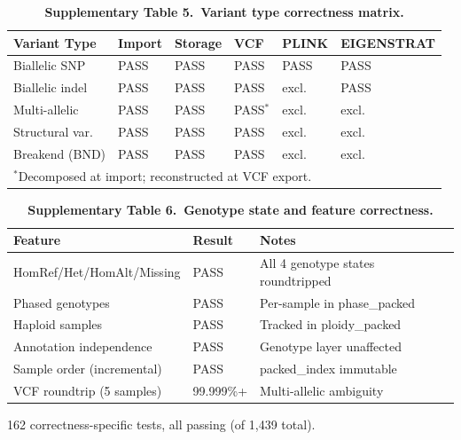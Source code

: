 \documentclass[11pt,a4paper]{article}
\begin{document}
\begin{table}[p]
\centering
\caption*{\textbf{Supplementary Table 5.~Variant type correctness matrix.}}
\vspace{0.5em}
\begin{tabular}{@{}llllll@{}}
\toprule
Variant Type & Import & Storage & VCF & PLINK & EIGENSTRAT \\
\midrule
Biallelic SNP & PASS & PASS & PASS & PASS & PASS \\
Biallelic indel & PASS & PASS & PASS & excl. & PASS \\
Multi-allelic & PASS & PASS & PASS$^{*}$ & excl. & excl. \\
Structural var. & PASS & PASS & PASS & excl. & excl. \\
Breakend (BND) & PASS & PASS & PASS & excl. & excl. \\
\bottomrule
\multicolumn{6}{l}{\footnotesize $^{*}$Decomposed at import; reconstructed at VCF export.}
\end{tabular}
\end{table}

\clearpage

\begin{table}[p]
\centering
\caption*{\textbf{Supplementary Table 6.~Genotype state and feature correctness.}}
\vspace{0.5em}
\begin{tabular}{@{}lll@{}}
\toprule
Feature & Result & Notes \\
\midrule
HomRef/Het/HomAlt/Missing & PASS & All 4 genotype states roundtripped \\
Phased genotypes & PASS & Per-sample in phase\_packed \\
Haploid samples & PASS & Tracked in ploidy\_packed \\
Annotation independence & PASS & Genotype layer unaffected \\
Sample order (incremental) & PASS & packed\_index immutable \\
VCF roundtrip (5 samples) & 99.999\%+ & Multi-allelic ambiguity \\
\bottomrule
\end{tabular}

\vspace{0.5em}
\noindent\footnotesize 162 correctness-specific tests, all passing (of 1,439 total).
\end{table}

\clearpage
\end{document}
